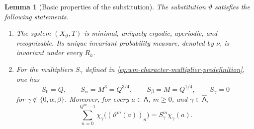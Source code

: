 \documentclass[11pt,reqno,a4paper]{amsart}
\numberwithin{equation}{section}
\theoremstyle{compact}
\newtheorem{lemma}[lemma]{Lemma}
\theoremstyle{definition}
\theoremstyle{definition}
\begin{document}
\begin{lemma}[Basic properties of the substitution]
\label{lem:wm-substitution-estimates}
The substitution $\vartheta$ satisfies the following statements.

\begin{enumerate}
\item The system $(X_\vartheta,T)$ is minimal, uniquely ergodic, aperiodic,
and recognizable.  Its unique invariant probability measure, denoted by
$\nu$, is invariant under every $R_h$.

\item For the multipliers $S_\gamma$ defined in
\eqref{eq:wm-character-multiplier-predefinition}, one has
\begin{equation}\label{eq:wm-character-multipliers}
  S_0=Q,
  \qquad
  S_\alpha=M^3=Q^{3/4},
  \qquad
  S_\beta=M=Q^{1/4},
  \qquad
  S_\gamma=0
\end{equation}
for $\gamma\notin\{0,\alpha,\beta\}$.  Moreover, for every
$a\in\mathsf A$, $m\geq0$, and $\gamma\in\widehat{\mathsf A}$,
\begin{equation}\label{eq:wm-exact-character-word-sum}
  \sum_{n=0}^{Q^m-1}
  \chi_\gamma\bigl((\vartheta^m(a))_n\bigr)
  =S_\gamma^m\chi_\gamma(a).
\end{equation}
\end{enumerate}
\end{lemma}
\end{document}
